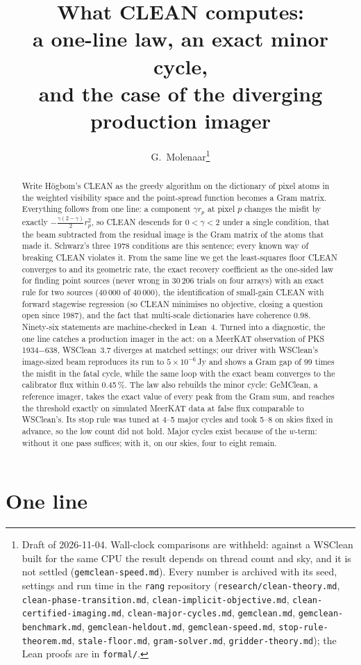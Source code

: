 \documentclass[twocolumn,10pt]{article}
\title{\vspace{-8mm}What CLEAN computes:\\ a one-line law, an exact minor cycle,\\ and the case of the diverging production imager}
\author{G.~Molenaar\thanks{Draft of 2026-11-04. Wall-clock comparisons are withheld: against a WSClean built for the same CPU the result depends on thread count and sky, and it is not settled (\texttt{gemclean-speed.md}). Every number is archived with its seed, settings and run time in the \texttt{rang} repository (\texttt{research/clean-theory.md}, \texttt{clean-phase-transition.md}, \texttt{clean-implicit-objective.md}, \texttt{clean-certified-imaging.md}, \texttt{clean-major-cycles.md}, \texttt{gemclean.md}, \texttt{gemclean-benchmark.md}, \texttt{gemclean-heldout.md}, \texttt{gemclean-speed.md}, \texttt{stop-rule-theorem.md}, \texttt{stale-floor.md}, \texttt{gram-solver.md}, \texttt{gridder-theory.md}); the Lean proofs are in \texttt{formal/}.}}
\date{}
\theoremstyle{remark}
\begin{document}
\maketitle

\begin{abstract}
Write H\"ogbom's CLEAN as the greedy algorithm on the dictionary of pixel atoms in the weighted visibility space and the point-spread function becomes a Gram matrix. Everything follows from one line: a component $\gamma r_p$ at pixel $p$ changes the misfit by exactly $-\tfrac{\gamma(2-\gamma)}{2}r_p^2$, so CLEAN descends for $0<\gamma<2$ under a single condition, that the beam subtracted from the residual image is the Gram matrix of the atoms that made it. Schwarz's three 1978 conditions are this sentence; every known way of breaking CLEAN violates it. From the same line we get the least-squares floor CLEAN converges to and its geometric rate, the exact recovery coefficient as the one-sided law for finding point sources (never wrong in $30\,206$ trials on four arrays) with an exact rule for two sources ($40\,000$ of $40\,000$), the identification of small-gain CLEAN with forward stagewise regression (so CLEAN minimises no objective, closing a question open since 1987), and the fact that multi-scale dictionaries have coherence 0.98. Ninety-six statements are machine-checked in Lean~4. Turned into a diagnostic, the one line catches a production imager in the act: on a MeerKAT observation of PKS\,1934$-$638, WSClean~3.7 diverges at matched settings; our driver with WSClean's image-sized beam reproduces its run to $5\times10^{-6}$\,Jy and shows a Gram gap of 99 times the misfit in the fatal cycle, while the same loop with the exact beam converges to the calibrator flux within 0.45\,\%. The law also rebuilds the minor cycle: GeMClean, a reference imager, takes the exact value of every peak from the Gram sum, and reaches the threshold exactly on simulated MeerKAT data at false flux comparable to WSClean's. Its stop rule was tuned at 4--5 major cycles and took 5--8 on skies fixed in advance, so the low count did not hold. Major cycles exist because of the $w$-term: without it one pass suffices; with it, on our skies, four to eight remain.
\end{abstract}

\section{One line}
\end{document}
